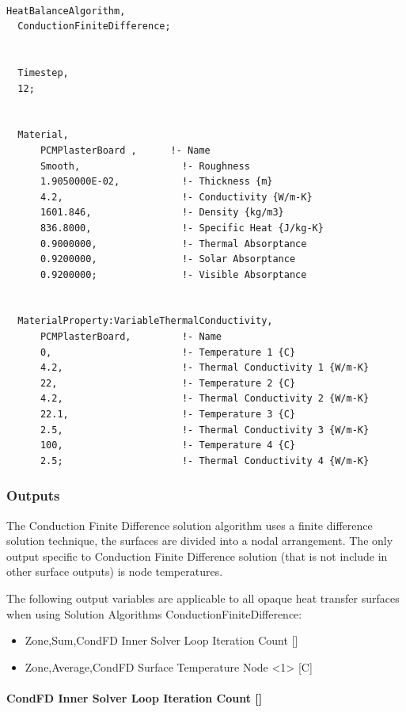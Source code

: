 \begin{lstlisting}

HeatBalanceAlgorithm,
  ConductionFiniteDifference;


  Timestep,
  12;


  Material,
      PCMPlasterBoard ,      !- Name
      Smooth,                  !- Roughness
      1.9050000E-02,           !- Thickness {m}
      4.2,                     !- Conductivity {W/m-K}
      1601.846,                !- Density {kg/m3}
      836.8000,                !- Specific Heat {J/kg-K}
      0.9000000,               !- Thermal Absorptance
      0.9200000,               !- Solar Absorptance
      0.9200000;               !- Visible Absorptance


  MaterialProperty:VariableThermalConductivity,
      PCMPlasterBoard,         !- Name
      0,                       !- Temperature 1 {C}
      4.2,                     !- Thermal Conductivity 1 {W/m-K}
      22,                      !- Temperature 2 {C}
      4.2,                     !- Thermal Conductivity 2 {W/m-K}
      22.1,                    !- Temperature 3 {C}
      2.5,                     !- Thermal Conductivity 3 {W/m-K}
      100,                     !- Temperature 4 {C}
      2.5;                     !- Thermal Conductivity 4 {W/m-K}
\end{lstlisting}

\subsubsection{Outputs}\label{outputs-1-026}

The Conduction Finite Difference solution algorithm uses a finite difference solution technique, the surfaces are divided into a nodal arrangement. The only output specific to Conduction Finite Difference solution (that is not include in other surface outputs) is node temperatures.

The following output variables are applicable to all opaque heat transfer surfaces when using Solution Algorithms ConductionFiniteDifference:

\begin{itemize}
\item
  Zone,Sum,CondFD Inner Solver Loop Iteration Count {[]}
\item
  Zone,Average,CondFD Surface Temperature Node \textless{}1\textgreater{} {[}C{]}
\end{itemize}

\paragraph{CondFD Inner Solver Loop Iteration Count {[]}}\label{condfd-inner-solver-loop-iteration-count}

